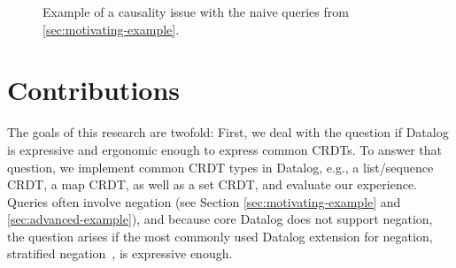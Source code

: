 \documentclass{article}
\newcommand{\setop}[5][set]{$\mathit{#1}_{#2}^{#3}(#4, #5)$}
\begin{document}
\begin{figure*}
    \centering
    \caption{
        Example of a causality issue with the naive queries from \autoref{sec:motivating-example}.
    }
    \label{fig:causal-issue}
\end{figure*}

\section{Contributions}
\label{sec:contributions}

The goals of this research are twofold:
First, we deal with the question if Datalog is expressive and ergonomic enough
to express common CRDTs.
To answer that question, we implement common CRDT types in Datalog, e.g.,
a list/sequence CRDT, a map CRDT, as well as a set CRDT,
and evaluate our experience.
Queries often involve negation (see Section \ref{sec:motivating-example} and
\ref{sec:advanced-example}),
and because core Datalog does not support negation, the question arises if
the most commonly used Datalog extension for negation,
stratified negation~\cite{green2013datalog}, is expressive enough.
\end{document}
